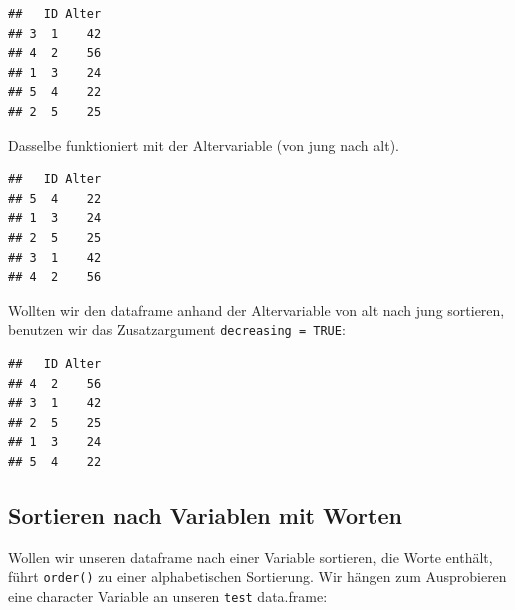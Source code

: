 \documentclass[
]{book}
\newenvironment{Shaded}{\begin{snugshade}}{\end{snugshade}}
\newcommand{\AttributeTok}[1]{\textcolor[rgb]{0.13,0.29,0.53}{#1}}
\newcommand{\CommentTok}[1]{\textcolor[rgb]{0.56,0.35,0.01}{\textit{#1}}}
\newcommand{\ConstantTok}[1]{\textcolor[rgb]{0.56,0.35,0.01}{#1}}
\newcommand{\FunctionTok}[1]{\textcolor[rgb]{0.13,0.29,0.53}{\textbf{#1}}}
\newcommand{\NormalTok}[1]{#1}
\newcommand{\OtherTok}[1]{\textcolor[rgb]{0.56,0.35,0.01}{#1}}
\newcommand{\SpecialCharTok}[1]{\textcolor[rgb]{0.81,0.36,0.00}{\textbf{#1}}}
\begin{document}
\begin{verbatim}
##   ID Alter
## 3  1    42
## 4  2    56
## 1  3    24
## 5  4    22
## 2  5    25
\end{verbatim}

Dasselbe funktioniert mit der Altervariable (von jung nach alt).

\begin{Shaded}
\end{Shaded}

\begin{verbatim}
##   ID Alter
## 5  4    22
## 1  3    24
## 2  5    25
## 3  1    42
## 4  2    56
\end{verbatim}

Wollten wir den dataframe anhand der Altervariable von alt nach jung sortieren, benutzen wir das Zusatzargument \texttt{decreasing\ =\ TRUE}:

\begin{Shaded}
\end{Shaded}

\begin{verbatim}
##   ID Alter
## 4  2    56
## 3  1    42
## 2  5    25
## 1  3    24
## 5  4    22
\end{verbatim}

\subsection{Sortieren nach Variablen mit Worten}\label{sortieren-nach-variablen-mit-worten}

Wollen wir unseren dataframe nach einer Variable sortieren, die Worte enthält, führt \texttt{order()} zu einer alphabetischen Sortierung. Wir hängen zum Ausprobieren eine character Variable an unseren \texttt{test} data.frame:
\end{document}
